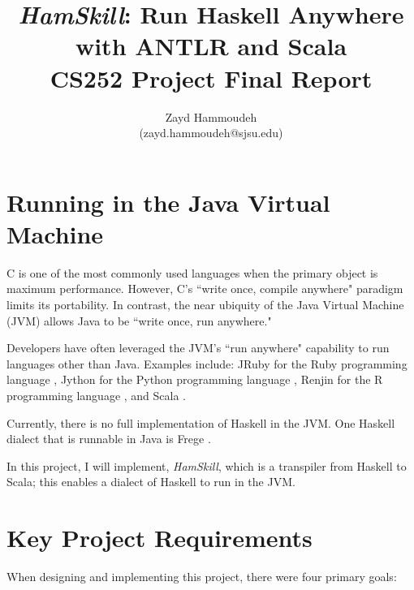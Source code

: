 \documentclass{report}
\title{\emph{HamSkill}: Run Haskell Anywhere \\
with ANTLR and Scala\\[1in]
	   CS252 Project Final Report}
\author{
  Zayd Hammoudeh \\
  (zayd.hammoudeh@sjsu.edu)
  }
\begin{document}
\maketitle


\tableofcontents{\protect\newpage}

\listoffigures
\newpage
 

\renewcommand\thesection{\arabic{section}}

\section{Running in the Java Virtual Machine}\label{sec:jvm}

C is one of the most commonly used languages when the primary object is maximum performance.  However, C's ``write once, compile anywhere" paradigm limits its portability.  In contrast, the near ubiquity of the Java Virtual Machine (JVM) allows Java to be ``write once, run anywhere."  

Developers have often leveraged the JVM's ``run anywhere" capability to run languages other than Java.  Examples include: JRuby for the Ruby programming language \cite{jruby}, Jython for the Python programming language \cite{jython_jvm}, Renjin for the R programming language \cite{renjin}, and Scala \cite{scala}.

Currently, there is no full implementation of Haskell in the JVM.  One Haskell dialect that is runnable in Java is Frege \cite{frege}.  

In this project, I will implement, \emph{HamSkill}, which is a transpiler from Haskell to Scala; this enables a dialect of Haskell to run in the JVM.  

\section{Key Project Requirements}\label{sec:keyProjectRequirements}

When designing and implementing this project, there were four primary goals:
\end{document}

